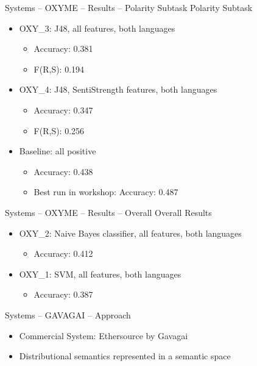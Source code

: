 \documentclass[12pt,a4paper]{beamer}
\begin{document}
\begin{frame}{Systems -- OXYME -- Results -- Polarity Subtask}
Polarity Subtask
\begin{itemize}
\item OXY\_3: J48, all features, both languages
  \begin{itemize}
  \item Accuracy: 0.381
  \item F(R,S): 0.194
  \end{itemize}
\item OXY\_4: J48, SentiStrength features, both languages
  \begin{itemize}
   \item Accuracy: 0.347
   \item F(R,S): 0.256
  \end{itemize}
\item Baseline: all positive
  \begin{itemize}
  \item Accuracy: 0.438
  \item Best run in workshop: Accuracy: 0.487
  \end{itemize}
\end{itemize}

\end{frame}

\begin{frame}{Systems -- OXYME -- Results -- Overall}
Overall Results
\begin{itemize}
 \item OXY\_2: Naive Bayes classifier, all features, both languages
  \begin{itemize}
  \item Accuracy: 0.412
  \end{itemize}
\item OXY\_1: SVM, all features, both languages
  \begin{itemize}
  \item Accuracy: 0.387
  \end{itemize}
\end{itemize}

\end{frame}

\begin{frame}{Systems -- GAVAGAI -- Approach}
\begin{itemize}
\item Commercial System: Ethersource by Gavagai \cite{gavagai}
\item Distributional semantics represented in a semantic space
\end{itemize}

\end{frame}
\end{document}
